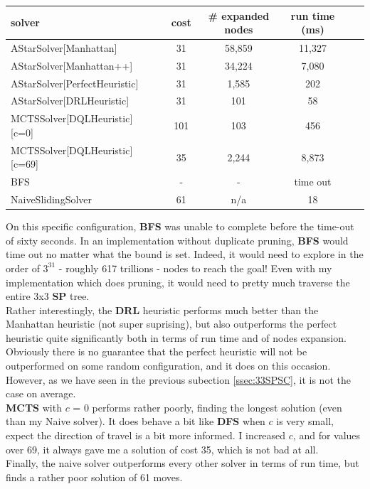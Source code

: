 \begin{center}
\begin{tabular}{l*{5}{c}r}
\hline
\textbf{solver}      & & \textbf{cost} & \textbf{\# expanded nodes} & \textbf{run time (ms)} \\
\hline
AStarSolver[Manhattan]   &   &      31  & 58,859  & 11,327  \\
\hline
AStarSolver[Manhattan++]   &   &      31  & 34,224  & 7,080  \\
\hline
AStarSolver[PerfectHeuristic]  &   & 31 & 1,585 & 202 \\
\hline
AStarSolver[DRLHeuristic]  &   & 31 & 101 & 58 \\
\hline
MCTSSolver[DQLHeuristic][c=0]  &   & 101 & 103 & 456 \\
\hline
MCTSSolver[DQLHeuristic][c=69]  &   & 35 & 2,244 & 8,873 \\
\hline
BFS  &   & - & - & time out \\
\hline
NaiveSlidingSolver  &   & 61 & n/a & 18 \\
\hline
\end{tabular}
\end{center}
On this specific configuration, \textbf{BFS} was unable to complete before the time-out of sixty seconds. In an implementation without duplicate pruning, \textbf{BFS} would time out no matter what the bound is set. Indeed, it would need to explore in the order of $3^{31}$ - roughly 617 trillions - nodes to reach the goal! Even with my implementation which does pruning, it would need to pretty much traverse the entire 3x3 \textbf{SP} tree.
\\
Rather interestingly, the \textbf{DRL} heuristic performs much better than the Manhattan heuristic (not super suprising), but also outperforms the perfect heuristic quite significantly both in terms of run time and of nodes expansion. Obviously there is no guarantee that the perfect heuristic will not be outperformed on some random configuration, and it does on this occasion. However, as we have seen in the previous subection \ref{ssec:33SPSC}, it is not the case on average.
\\
\textbf{MCTS} with $c$ = 0 performs rather poorly, finding the longest solution (even than my Naive solver). It does behave a bit like \textbf{DFS} when $c$ is very small, expect the direction of travel is a bit more informed. I increased $c$, and for values over 69, it always gave me a solution of cost 35, which is not bad at all.
\\
Finally, the naive solver outperforms every other solver in terms of run time, but finds a rather poor solution of 61 moves.




